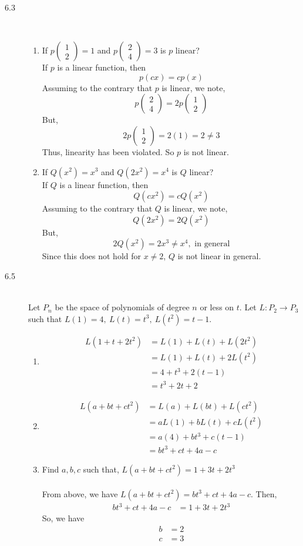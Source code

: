 \documentclass[letterpaper,10pt]{article}
\newcommand{\twoby}[2]{\begin{pmatrix}
#1 \\
#2
\end{pmatrix}}
\begin{document}
\begin{description}
\item[6.3]\hfill\\
\begin{enumerate}[label=\alph*.]
\item If $p\twoby{1}{2}=1$ and $p\twoby{2}{4}=3$ is $p$ linear?\\
If $p$ is a linear function, then
\[p(cx)=cp(x)\]
Assuming to the contrary that $p$ is linear, we note,
\[p\twoby{2}{4}=2p\twoby{1}{2}\]
But,
\[2p\twoby{1}{2}=2(1)=2\neq 3\]
Thus, linearity has been violated. So $p$ is not linear.
\item If $Q(x^2)=x^3$ and $Q(2x^2)=x^4$ is $Q$ linear?\\
If $Q$ is a linear function, then
\[Q(cx^2)=cQ(x^2)\]
Assuming to the contrary that $Q$ is linear, we note,
\[Q(2x^2)=2Q(x^2)\]
But,
\[2Q(x^2)=2x^3\neq x^4,\text{ in general}\]
Since this does not hold for $x\neq 2$, $Q$ is not linear in general.
\end{enumerate}
\item[6.5]\hfill\\
Let $P_n$ be the space of polynomials of degree $n$ or less on $t$. Let $L:P_2\to P_3$ such that $L(1)=4,\ L(t)=t^3,\ L(t^2)=t-1$.
\begin{enumerate}[label=\alph*.]
\item \begin{align*}
L(1+t+2t^2) &=L(1)+L(t)+L(2t^2)\\
&=L(1)+L(t)+2L(t^2)\\
&=4+t^3+2(t-1)\\
&=t^3+2t+2
\end{align*}
\item \begin{align*}
L(a+bt+ct^2) &=L(a)+L(bt)+L(ct^2)\\
&=aL(1)+bL(t)+cL(t^2)\\
&=a(4)+bt^3+c(t-1)\\
&=bt^3+ct+4a-c
\end{align*}
\item Find $a,b,c$ such that, $L(a+bt+ct^2)=1+3t+2t^3$\\\\
From above, we have $L(a+bt+ct^2)=bt^3+ct+4a-c$. Then,
\begin{align*}
bt^3+ct+4a-c&=1+3t+2t^3
\end{align*}
So, we have
\begin{align*}
b&=2\\
c&=3\\

\end{align*}
\end{enumerate}
\end{description}
\end{document}
